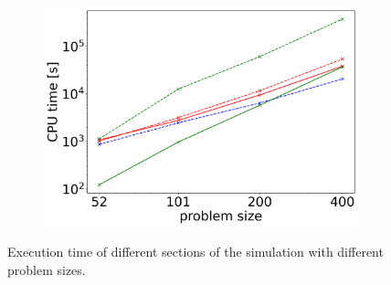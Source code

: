 \begin{figure}[H]
\begin{subfigure}[b]{0.32\textwidth}
		\centering
		\includegraphics[width=1\textwidth]{images/TANDEM_CPU_Time_solving.png}
	\end{subfigure}
	\caption{Execution time of different sections of the simulation with different problem sizes.}
	\label{fig:scalabilty_executionTimes}
\end{figure}

